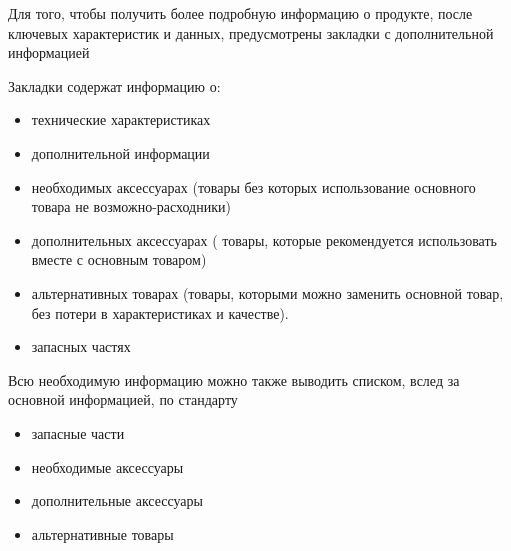 {

\begin{itogolong}
Для того, чтобы получить более подробную информацию о продукте, после ключевых характеристик и данных, предусмотрены закладки с дополнительной информацией

Закладки содержат информацию о:
\begin{itemize}
\item технические характеристиках 
\item дополнительной информации
\item необходимых аксессуарах (товары без которых использование основного товара не возможно-расходники)
\item дополнительных аксессуарах ( товары, которые рекомендуется использовать вместе с основным товаром) 
\item альтернативных товарах (товары, которыми можно заменить основной товар, без потери в характеристиках и качестве). 
\item запасных частях
\end{itemize}

Всю необходимую информацию можно также выводить списком, вслед за основной информацией, по стандарту 
\begin{itemize}
\item запасные части
\item необходимые аксессуары
\item дополнительные аксессуары
\item альтернативные товары
\end{itemize}

\end{itogolong}




}


